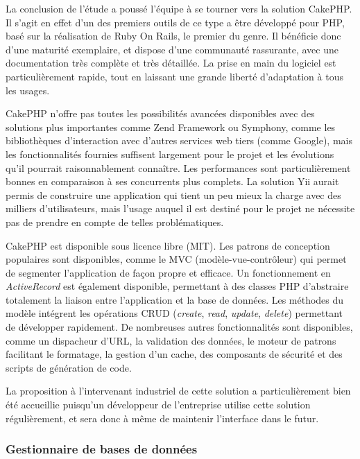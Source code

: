 La conclusion de l'étude a poussé l'équipe à se tourner vers la solution CakePHP. Il s'agit en effet d'un des premiers outils de ce type a être développé pour PHP, basé sur la réalisation de Ruby On Rails, le premier du genre. Il bénéficie donc d'une maturité exemplaire, et dispose d'une communauté rassurante, avec une documentation très complète et très détaillée. La prise en main du logiciel est particulièrement rapide, tout en laissant une grande liberté d'adaptation à tous les usages.

CakePHP n'offre pas toutes les possibilités avancées disponibles avec des solutions plus importantes comme Zend Framework ou Symphony, comme les bibliothèques d'interaction avec d'autres services web tiers (comme Google), mais les fonctionnalités fournies suffisent largement pour le projet et les évolutions qu'il pourrait raisonnablement connaître. Les performances sont particulièrement bonnes en comparaison à ses concurrents plus complets. La solution Yii aurait permis de construire une application qui tient un peu mieux la charge avec des milliers d'utilisateurs, mais l'usage auquel il est destiné pour le projet ne nécessite pas de prendre en compte de telles problématiques.

CakePHP est disponible sous licence libre (MIT). Les patrons de conception populaires sont disponibles, comme le MVC (modèle-vue-contrôleur) qui permet de segmenter l'application de façon propre et efficace. Un fonctionnement en \textit{ActiveRecord} est également disponible, permettant à des classes PHP d'abstraire totalement la liaison entre l'application et la base de données. Les méthodes du modèle intégrent les opérations CRUD (\textit{create}, \textit{read}, \textit{update}, \textit{delete}) permettant de développer rapidement. De nombreuses autres fonctionnalités sont disponibles, comme un dispacheur d'URL, la validation des données, le moteur de patrons facilitant le formatage, la gestion d'un cache, des composants de sécurité et des scripts de génération de code.

La proposition à l'intervenant industriel de cette solution a particulièrement bien été accueillie puisqu'un développeur de l'entreprise utilise cette solution régulièrement, et sera donc à même de maintenir l'interface dans le futur.

\subsubsection{Gestionnaire de bases de données}

